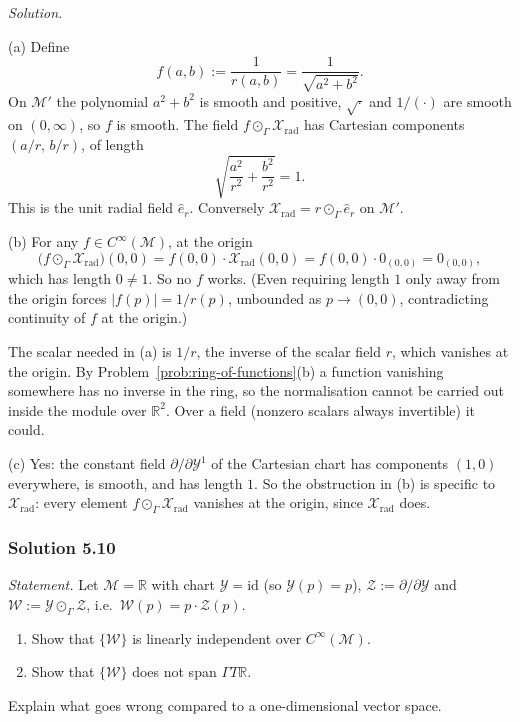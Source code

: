 \documentclass[11pt]{article}
\newcommand{\Cinf}{C^\infty(\mathcal M)}
\begin{document}
\medskip
\noindent\textit{Solution.}

(a) Define
\[
f(a,b):=\frac1{r(a,b)}=\frac{1}{\sqrt{a^2+b^2}}.
\]
On $\mathcal M'$ the polynomial $a^2+b^2$ is smooth and positive,
$\sqrt{\cdot}$ and $1/(\cdot)$ are smooth on $(0,\infty)$, so $f$ is
smooth. The field $f\odot_\Gamma\mathcal X_{\mathrm{rad}}$ has Cartesian
components $(a/r,\,b/r)$, of length
\[
\sqrt{\frac{a^2}{r^2}+\frac{b^2}{r^2}}=1.
\]
This is the unit radial field $\hat e_r$. Conversely
$\mathcal X_{\mathrm{rad}}=r\odot_\Gamma\hat e_r$ on
$\mathcal M'$.

(b) For any $f\in\Cinf$, at the origin
\[
\big(f\odot_\Gamma\mathcal X_{\mathrm{rad}}\big)(0,0)=f(0,0)\cdot\mathcal X_{\mathrm{rad}}(0,0)=f(0,0)\cdot0_{(0,0)}=0_{(0,0)},
\]
which has length $0\neq1$. So no $f$ works. (Even requiring length $1$ only
away from the origin forces $|f(p)|=1/r(p)$, unbounded as $p\to(0,0)$,
contradicting continuity of $f$ at the origin.)

The scalar needed in (a) is $1/r$, the inverse of the scalar field $r$,
which vanishes at the origin. By Problem~\ref{prob:ring-of-functions}(b) a
function vanishing somewhere has no inverse in the ring, so the
normalisation cannot be carried out inside the module over $\mathbb R^2$.
Over a field (nonzero scalars always invertible) it could.

(c) Yes: the constant field $\partial/\partial\mathcal Y^1$ of the
Cartesian chart has components $(1,0)$ everywhere, is smooth, and has
length $1$. So the obstruction in (b) is specific to $\mathcal
X_{\mathrm{rad}}$: every element $f\odot_\Gamma\mathcal X_{\mathrm{rad}}$
vanishes at the origin, since $\mathcal X_{\mathrm{rad}}$ does.

\subsubsection*{Solution 5.10}

\noindent\textit{Statement.} Let $\mathcal M=\mathbb R$ with chart
$\mathcal Y=\mathrm{id}$ (so $\mathcal Y(p)=p$), $\mathcal
Z:=\partial/\partial\mathcal Y$ and $\mathcal W:=\mathcal
Y\odot_\Gamma\mathcal Z$, i.e.\ $\mathcal W(p)=p\cdot\mathcal Z(p)$.
\begin{enumerate}[label=(\alph*)]
  \item Show that $\{\mathcal W\}$ is linearly independent over $\Cinf$.
  \item Show that $\{\mathcal W\}$ does not span $\Gamma T\mathbb R$.
\end{enumerate}
Explain what goes wrong compared to a one-dimensional vector space.
\end{document}
